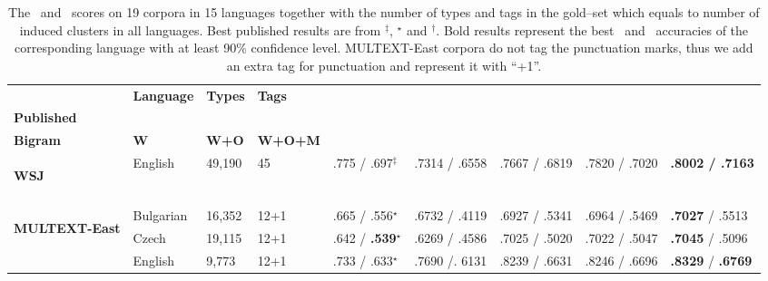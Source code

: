 \begin{table}[ht]
  \small
  \centering
  \caption{The \mto\ and \vm\ scores on 19 corpora in 15 languages
    together with the number of types and tags in the gold--set which
    equals to number of induced clusters in all languages.  Best
    published results are from
    $^\ddagger$\protect\cite{blunsom-cohn:2011:ACL-HLT2011},
    $^\star$\protect\cite{christodoulopoulos-goldwater-steedman:2011:EMNLP}
    and $^\dagger$\protect\cite{Clark:2003:CDM:1067807.1067817}. Bold
    results represent the best \mto\ and \vm\ accuracies of the
    corresponding language with at least 90\% confidence level.
    MULTEXT-East corpora do not tag the punctuation marks, thus we add
    an extra tag for punctuation and represent it with ``+1''.}
  \label{tab:multiresults}
  \begin{flushleft}
  \begin{tabular}{|@{ }l@{ }|@{ }l@{ }|@{ }l@{ }|@{ }l@{ }|@{ }l@{ }|@{ }l@{ }|@{ }l@{ }|@{ }l@{ }|@{ }l@{ }|}
        \hline
        & {\bf Language}   & {\bf Types}   & {\bf Tags} & \specialcell{{\bf Best}\\{\bf Published}} &
        \specialcell{{\bf Syntagmatic}\\{\bf Bigram}} &{\bf W}
        & {\bf W+O}            & {\bf W+O+M}     \\ \hline %
        \multirow{1}{*}{\begin{sideways}\textbf{WSJ}\end{sideways}} 
        & English    & 49,190  & 45 & .775 / .697$^\ddagger$  &.7314 / .6558 & .7667 / .6819 & .7820 / .7020 &{\bf.8002 / .7163}           \\
        & & & & & & & &\\ \hline
        \multirow{8}{*}{\begin{sideways}\textbf{MULTEXT-East}\end{sideways}}
        & Bulgarian    & 16,352  & 12+1 & .665 / .556$^\star$    & .6732 / .4119 & .6927 / .5341 & .6964 / .5469     & {\bf.7027} / .5513 \\
        & Czech      & 19,115  & 12+1 & .642 / {\bf.539}$^\star$    & .6269 / .4586 & .7025 / .5020 & .7022 / .5047     & {\bf .7045} / .5096 \\
        & English    & 9,773   & 12+1 & .733 / .633$^\star$    & .7690 /. 6131 & .8239 / .6631 & .8246 / .6696      & {\bf .8329} / {\bf.6769} \\

\end{tabular}
\end{flushleft}
\end{table}
